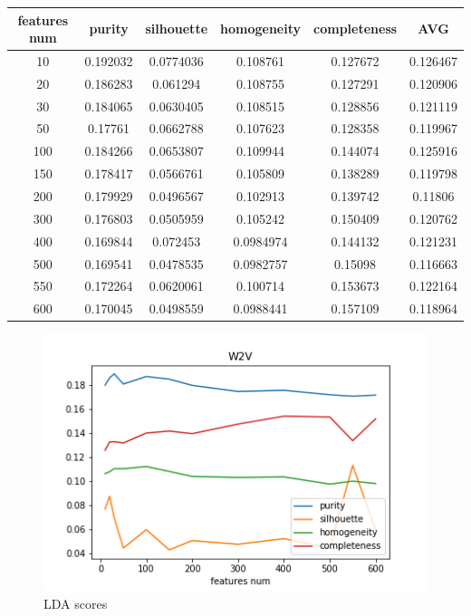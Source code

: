 \documentclass[11pt]{article}
\begin{document}
\begin{tabular}{ |c|c|c|c|c|c| }
\hline
features num & purity  & silhouette  & homogeneity  & completeness  & AVG\\ \hline 
10  & 0.192032  & 0.0774036  & 0.108761  & 0.127672  & 0.126467\\ \hline 
20  & 0.186283  & 0.061294  & 0.108755  & 0.127291  & 0.120906\\ \hline 
30  & 0.184065  & 0.0630405  & 0.108515  & 0.128856  & 0.121119\\ \hline 
50  & 0.17761  & 0.0662788  & 0.107623  & 0.128358  & 0.119967\\ \hline 
100  & 0.184266  & 0.0653807  & 0.109944  & 0.144074  & 0.125916\\ \hline 
150  & 0.178417  & 0.0566761  & 0.105809  & 0.138289  & 0.119798\\ \hline 
200  & 0.179929  & 0.0496567  & 0.102913  & 0.139742  & 0.11806\\ \hline 
300  & 0.176803  & 0.0505959  & 0.105242  & 0.150409  & 0.120762\\ \hline 
400  & 0.169844  & 0.072453  & 0.0984974  & 0.144132  & 0.121231\\ \hline 
500  & 0.169541  & 0.0478535  & 0.0982757  & 0.15098  & 0.116663\\ \hline 
550  & 0.172264  & 0.0620061  & 0.100714  & 0.153673  & 0.122164\\ \hline 
600  & 0.170045  & 0.0498559  & 0.0988441  & 0.157109  & 0.118964 \\
\hline
\end{tabular}

 \begin{figure}[h]
 	\centering
 	\includegraphics[scale=0.7]{w2v_scores.png}
	\caption{LDA scores}
 \label{words_freq}
 \end{figure}
\end{document}
